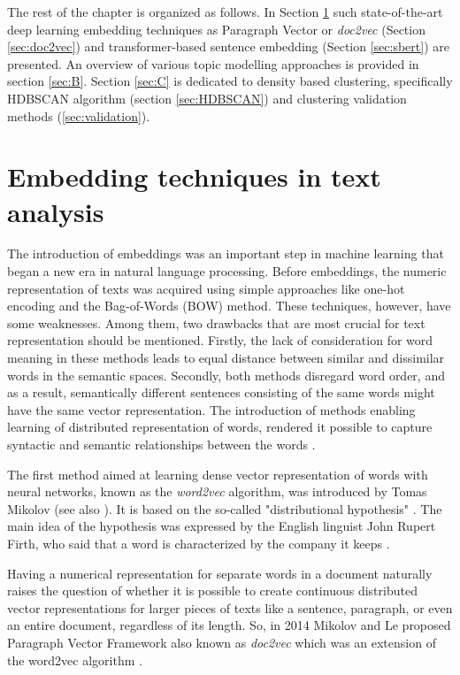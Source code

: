 \documentclass[fontsize=12pt,a4paper,twoside,openany]{scrbook}
\begin{document}
The rest of the chapter is organized as follows. In Section \ref{sec:A} such state-of-the-art deep learning embedding techniques as Paragraph Vector or \emph{doc2vec} (Section \ref{sec:doc2vec}) and transformer-based sentence embedding (Section \ref{sec:sbert}) are presented. An overview of various topic modelling approaches is provided in section \ref{sec:B}. Section \ref{sec:C} is dedicated to density based clustering, specifically HDBSCAN algorithm (section \ref{sec:HDBSCAN}) and clustering validation methods (\ref{sec:validation}).  

\section{Embedding techniques in text analysis}
\label{sec:A}

The introduction of embeddings was an important step in machine learning that began a new era in natural language processing. Before embeddings, the numeric representation of texts was acquired using simple approaches like one-hot encoding and the Bag-of-Words (BOW) method. These techniques, however, have some weaknesses. Among them, two drawbacks that are most crucial for text representation should be mentioned. Firstly, the lack of consideration for word meaning in these methods leads to equal distance between similar and dissimilar words in the semantic spaces. Secondly, both methods disregard word order, and as a result, semantically different sentences consisting of the same words might have the same vector representation. The introduction of methods enabling learning of distributed representation of words, rendered it possible to capture syntactic and semantic relationships between the words \parencite{Le14}. 

The first method aimed at learning dense vector representation of words with neural networks, known as the \emph{word2vec} algorithm, was introduced by Tomas Mikolov \parencite{TMikolov13} (see also \parencite{Mikolov13}). It is based on the so-called "distributional hypothesis" \parencite{Harris54}. The main idea of the hypothesis was expressed by the English linguist John Rupert Firth, who said that a word is characterized by the company it keeps \parencite{Firth57}.

Having a numerical representation for separate words in a document naturally raises the question of whether it is possible to create continuous distributed vector representations for larger pieces of texts like a sentence, paragraph, or even an entire document, regardless of its length. So, in 2014 Mikolov and Le proposed Paragraph Vector Framework also known as \emph{doc2vec} which was an extension of the word2vec algorithm \parencite[see][]{Le14}.
\end{document}
